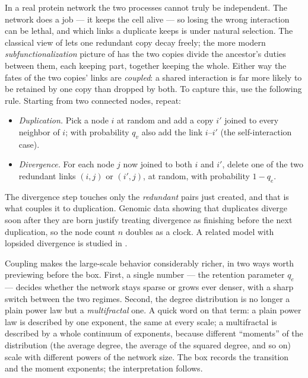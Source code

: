 In a real protein network the two processes cannot truly be independent. The
network does a job --- it keeps the cell alive --- so losing the wrong interaction
can be lethal, and which links a duplicate keeps is under natural selection. The
classical view of \citet{ohno1970} lets one redundant copy decay freely; the more
modern \emph{subfunctionalization} picture of \citet{force1999} has the two
copies divide the ancestor's duties between them, each keeping part, together
keeping the whole. Either way the fates of the two copies' links are
\emph{coupled}: a shared interaction is far more likely to be retained by one
copy than dropped by both. To capture this, \citet{vazquez2003pin} use the
following rule. Starting from two connected nodes, repeat:
\begin{itemize}
  \item \emph{Duplication.} Pick a node $i$ at random and add a copy $i'$ joined
    to every neighbor of $i$; with probability $q_v$ also add the link $i$--$i'$
    (the self-interaction case).
  \item \emph{Divergence.} For each node $j$ now joined to both $i$ and $i'$,
    delete one of the two redundant links $(i,j)$ or $(i',j)$, at random, with
    probability $1-q_e$.
\end{itemize}
The divergence step touches only the \emph{redundant} pairs just created, and
that is what couples it to duplication. Genomic data showing that duplicates
diverge soon after they are born \citep{wagner2001} justify treating divergence
as finishing before the next duplication, so the node count $n$ doubles as a
clock. A related model with lopsided divergence is studied in \citet{vazquez2003}.

Coupling makes the large-scale behavior considerably richer, in two ways worth
previewing before the box. First, a single number --- the retention parameter
$q_e$ --- decides whether the network stays sparse or grows ever denser, with a
sharp switch between the two regimes. Second, the degree distribution is no
longer a plain power law but a \emph{multifractal} one. A quick word on that
term: a plain power law is described by one exponent, the same at every scale; a
multifractal is described by a whole continuum of exponents, because different
``moments'' of the distribution (the average degree, the average of the squared
degree, and so on) scale with different powers of the network size. The box
records the transition and the moment exponents; the interpretation follows.

